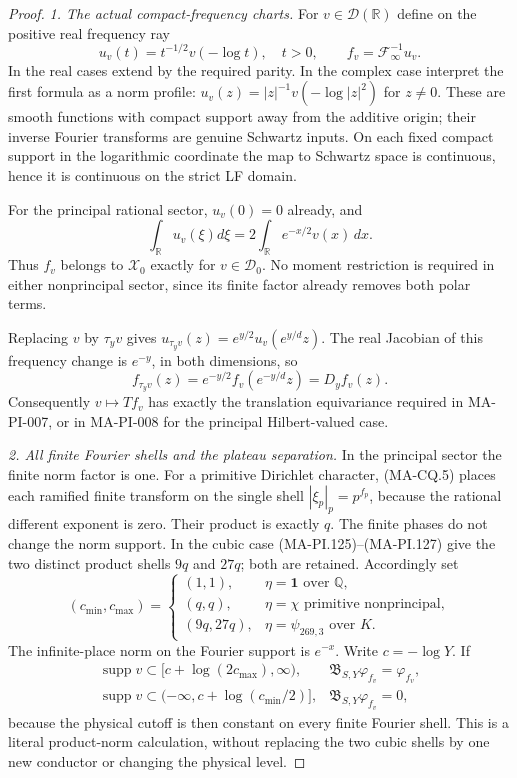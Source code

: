 \begin{proof}
\emph{1. The actual compact-frequency charts.}
For $v\in\mathcal D(\mathbb R)$ define on the positive
real frequency ray
\[
 u_v(t)=t^{-1/2}v(-\log t),\quad t>0,
 \qquad f_v=\mathcal F_\infty^{-1}u_v.
 \tag{MA-PI.196}
\]
In the real cases extend by the required parity.
In the complex case interpret the first formula as a norm
profile: $u_v(z)=|z|^{-1}v(-\log|z|^2)$ for $z\ne0$.
These are smooth functions with compact support away from
the additive origin; their inverse Fourier transforms are
genuine Schwartz inputs.  On each fixed compact support
in the logarithmic coordinate the map to Schwartz space is
continuous, hence it is continuous on the strict LF domain.

For the principal rational sector, $u_v(0)=0$ already,
and
\[
 \int_{\mathbb R}u_v(\xi)d\xi
       =2\int_{\mathbb R}e^{-x/2}v(x)\,dx.
 \tag{MA-PI.197}
\]
Thus $f_v$ belongs to $\mathscr X_0$ exactly for
$v\in\mathcal D_0$.  No moment restriction is required
in either nonprincipal sector, since its finite factor
already removes both polar terms.

Replacing $v$ by $\tau_yv$ gives
$u_{\tau_yv}(z)=e^{y/2}u_v(e^{y/d}z)$.
The real Jacobian of this frequency change is $e^{-y}$,
in both dimensions, so
\[
 f_{\tau_yv}(z)=e^{-y/2}f_v(e^{-y/d}z)=D_yf_v(z).
 \tag{MA-PI.198}
\]
Consequently $v\mapsto Tf_v$ has exactly the translation
equivariance required in MA-PI-007, or in MA-PI-008 for
the principal Hilbert-valued case.

\emph{2. All finite Fourier shells and the plateau separation.}
In the principal sector the finite norm factor is one.
For a primitive Dirichlet character, (MA-CQ.5) places
each ramified finite transform on the single shell
$|\xi_p|_p=p^{f_p}$, because the rational different
exponent is zero.  Their product is exactly $q$.
The finite phases do not change the norm support.
In the cubic case (MA-PI.125)--(MA-PI.127) give the two
distinct product shells $9q$ and $27q$; both are retained.
Accordingly set
\[
 (c_{\min},c_{\max})=
 \begin{cases}
 (1,1),&\eta=\mathbf1\text{ over }\mathbb Q,\\
 (q,q),&\eta=\chi\text{ primitive nonprincipal},\\
 (9q,27q),&\eta=\psi_{269,3}\text{ over }K.
 \end{cases}
 \tag{MA-PI.199}
\]
The infinite-place norm on the Fourier support is
$e^{-x}$.  Write $c=-\log Y$.  If
\[
 \begin{array}{ll}
 \operatorname{supp}v\subset[c+\log(2c_{\max}),\infty),
       &\mathfrak B_{S,Y}\varphi_{f_v}=\varphi_{f_v},\\
 \operatorname{supp}v\subset(-\infty,c+\log(c_{\min}/2)],
       &\mathfrak B_{S,Y}\varphi_{f_v}=0,
 \end{array}
 \tag{MA-PI.200}
\]
because the physical cutoff is then constant on every
finite Fourier shell.  This is a literal product-norm
calculation, without replacing the two cubic shells by
one new conductor or changing the physical level.


\end{proof}
